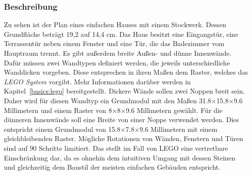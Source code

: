 \subsubsection*{Beschreibung}
Zu sehen ist der Plan eines einfachen Hauses mit einem Stockwerk.
Dessen Grundfläche beträgt 19,2 auf 14,4 cm.
Das Haus besitzt eine Eingangstür, eine Terrassentür neben einem Fenster und eine Tür, die das Badezimmer vom Hauptraum trennt.
Es gibt außerdem breite Außen- und dünne Innenwände.
Dafür müssen zwei Wandtypen definiert werden, die jeweils unterschiedliche Wanddicken vorgeben.
Diese entsprechen in ihren Maßen dem Raster, welches das \textit{LEGO System} vorgibt.
Mehr Informationen darüber werden in Kapitel~\ref{basics:lego} bereitgestellt.
Dickere Wände sollen zwei Noppen breit sein.
Daher wird für diesen Wandtyp ein Grundmodul mit den Maßen 31.8$\times$15.8$\times$9.6 Millimetern und einem Raster von 8$\times$8$\times$9.6 Millimetern gewählt.
Für die dünneren Innenwände soll eine Breite von einer Noppe verwendet werden.
Dies entspricht einem Grundmodul von 15.8$\times$7.8$\times$9.6 Millimetern mit einem gleichbleibenden Raster.
Mögliche Rotationen von Wänden, Fenstern und Türen sind auf 90\textdegree{} Schritte limitiert.
Das stellt im Fall von LEGO eine vertretbare Einschränkung dar, da es ohnehin dem intuitiven Umgang mit dessen Steinen und gleichzeitig dem Baustil der meisten einfachen Gebäuden entspricht.

